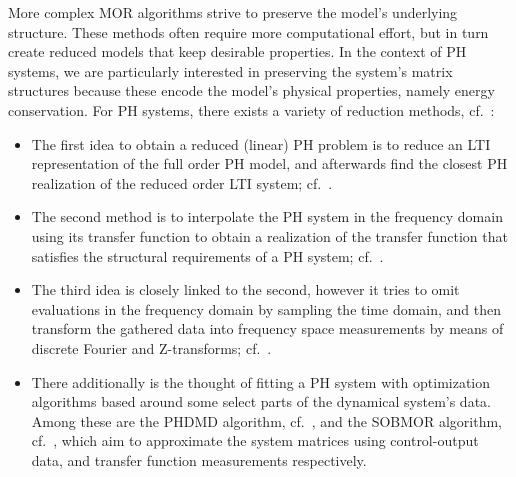 More complex MOR algorithms strive to preserve the model's underlying structure.
These methods often require more computational effort, but in turn create reduced models that keep desirable properties.
In the context of \ac{PH} systems, we are particularly interested in preserving the system's matrix structures because these encode the model's physical properties, namely energy conservation.
For \ac{PH} systems, there exists a variety of reduction methods, cf.~\cite{Polyuga2010}:
\begin{itemize}
    \item The first idea to obtain a reduced (linear) \ac{PH} problem is to reduce an \ac{LTI} representation of the full order \ac{PH} model, and afterwards find the closest \ac{PH} realization of the reduced order \ac{LTI} system; cf.~\cite{Gillis2018, Cherifi2019}.
    \item The second method is to interpolate the \ac{PH} system in the frequency domain using its transfer function to obtain a realization of the transfer function that satisfies the structural requirements of a \ac{PH} system; cf.~\cite{BGD2020, Schwerdtner2021, Poussot2022}.
    \item The third idea is closely linked to the second, however it tries to omit evaluations in the frequency domain by sampling the time domain, and then transform the gathered data into frequency space measurements by means of discrete Fourier and Z-transforms; cf.~\cite{Najnudel2021, Cherifi2022, Günther2023}.
    \item There additionally is the thought of fitting a \ac{PH} system with optimization algorithms based around some select parts of the dynamical system's data.
        Among these are the \ac{PHDMD} algorithm, cf.~\cite{Morandin2022}, and the SOBMOR algorithm, cf.~\cite{Schwerdtner2023}, which aim to approximate the system matrices using control-output data, and transfer function measurements respectively.
\end{itemize}

